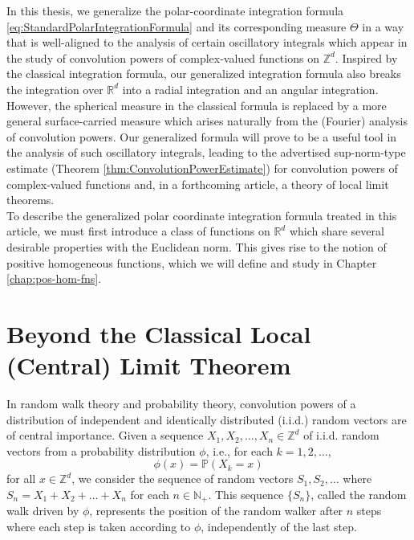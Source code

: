 \documentclass[11pt, letter]{book}
\begin{document}
\noindent In this thesis, we generalize the polar-coordinate integration formula \eqref{eq:StandardPolarIntegrationFormula} and its corresponding measure $\Theta$ in a way that is well-aligned to the analysis of certain oscillatory integrals which appear in the study of convolution powers of complex-valued functions on $\mathbb{Z}^d$. Inspired by the classical integration formula, our generalized integration formula also breaks the integration over $\mathbb{R}^d$ into a radial integration and an angular integration. However, the spherical measure in the classical formula is replaced by a more general surface-carried measure which arises naturally from the (Fourier) analysis of convolution powers. Our generalized formula will prove to be a useful tool in the analysis of such oscillatory integrals, leading to the advertised sup-norm-type estimate (Theorem \ref{thm:ConvolutionPowerEstimate}) for convolution powers of complex-valued functions and, in a forthcoming article, a theory of local limit theorems.\\ 

\noindent To describe the generalized polar coordinate integration formula treated in this article, we must first introduce a class of functions on $\mathbb{R}^d$ which share several desirable properties with the Euclidean norm. This gives rise to the notion of positive homogeneous functions, which we will define and study in Chapter \ref{chap:pos-hom-fns}.








\section{Beyond the Classical Local (Central) Limit Theorem}




\noindent In random walk theory and probability theory, convolution powers of a distribution of independent and identically distributed (i.i.d.) random vectors are of central importance. Given a sequence $X_1, X_2, \dots, X_n \in \mathbb{Z}^d$ of i.i.d. random vectors from a probability distribution $\phi$, i.e., for each $k=1,2,\dots$,
\begin{equation*}
    \phi(x)=\mathbb{P}(X_k=x)
\end{equation*}
for all $x\in\mathbb{Z}^d$, we consider the sequence of random vectors $S_1,S_2,\dots$ where $S_n=X_1+X_2 +\dots+X_n$ for each $n\in\mathbb{N}_+$. This sequence $\{S_n\}$, called the random walk driven by $\phi$, represents the position of the random walker after $n$ steps where each step is taken according to $\phi$, independently of the last step.\\
\end{document}
